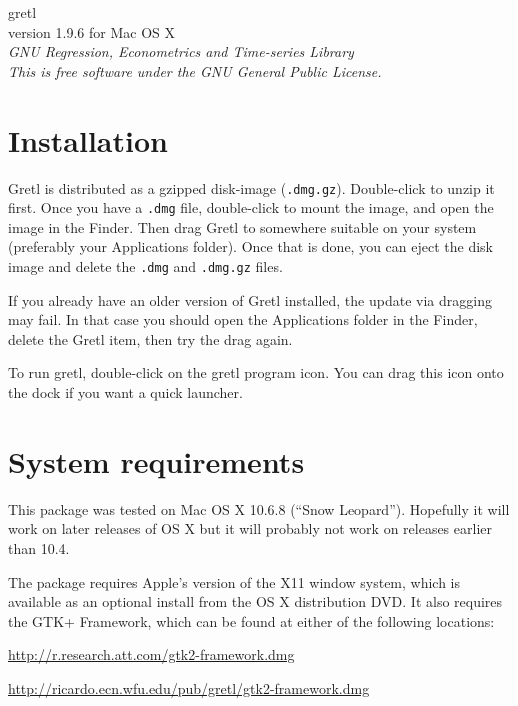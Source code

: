 \documentclass[11pt]{article}
\begin{document}
\begin{center}
{\color{gold} \titlefont gretl} \\[1ex]
version 1.9.6 for Mac OS X \\[2ex]

\textit{GNU Regression, Econometrics and Time-series Library\\
  This is free software under the GNU General Public License.}

\end{center}

\section{Installation}
\label{sec:install}

\textsf{Gretl} is distributed as a gzipped disk-image
(\texttt{.dmg.gz}).  Double-click to unzip it first.  Once you have a
\texttt{.dmg} file, double-click to mount the image, and open the
image in the Finder.  Then drag \textsf{Gretl} to somewhere suitable
on your system (preferably your \textsf{Applications} folder).  Once
that is done, you can eject the disk image and delete the
\texttt{.dmg} and \texttt{.dmg.gz} files.

If you already have an older version of \textsf{Gretl} installed, the
update via dragging may fail. In that case you should open the
\textsf{Applications} folder in the Finder, delete the \textsf{Gretl}
item, then try the drag again.

To run gretl, double-click on the gretl program icon.  You can drag
this icon onto the dock if you want a quick launcher.

\section{System requirements}
\label{sec:os}

This package was tested on Mac OS X 10.6.8 (``Snow Leopard'').
Hopefully it will work on later releases of OS X but it will probably
not work on releases earlier than 10.4.

The package requires Apple's version of the X11 window system, which
is available as an optional install from the OS X distribution DVD.
It also requires the GTK+ Framework, which can be found at either
of the following locations:

\url{http://r.research.att.com/gtk2-framework.dmg} 

\url{http://ricardo.ecn.wfu.edu/pub/gretl/gtk2-framework.dmg}
\end{document}

